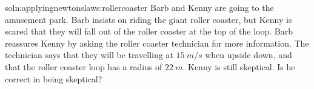
\begin{problem}{soln:applyingnewtonslaws:rollercoaster}{\label{prob:applyingnewtonslaws:rollercoaster} Barb and Kenny are going to the amusement park. Barb insists on riding the giant roller coaster, but Kenny is scared that they will fall out of the roller coaster at the top of the loop. Barb reassures Kenny by asking the roller coaster technician for more information. The technician says that they will be travelling at $\SI{15}{m/s}$ when upside down, and that the roller coaster loop has a radius of $\SI{22}{m}$. Kenny is still skeptical. Is he correct in being skeptical?}
\end{problem}

\newpage
